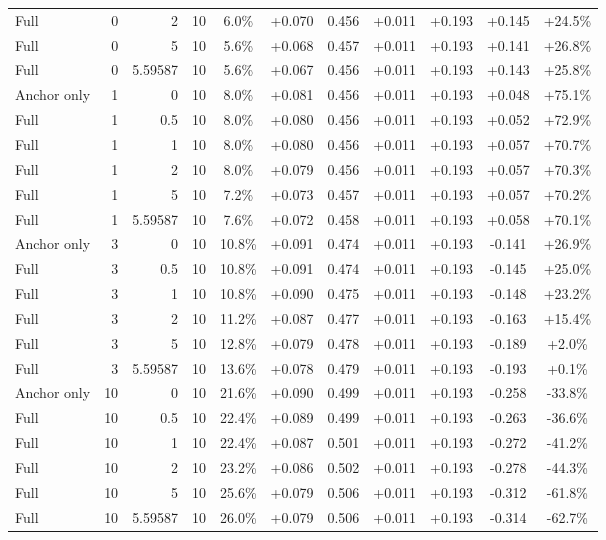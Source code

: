 \begin{table}[htbp]
\begin{tabular}{lrrrccccccc}
Full & 0 & 2 & 10 & 6.0\% & +0.070 & 0.456 & +0.011 & +0.193 & +0.145 & +24.5\% \\
Full & 0 & 5 & 10 & 5.6\% & +0.068 & 0.457 & +0.011 & +0.193 & +0.141 & +26.8\% \\
Full & 0 & 5.59587 & 10 & 5.6\% & +0.067 & 0.456 & +0.011 & +0.193 & +0.143 & +25.8\% \\
Anchor only & 1 & 0 & 10 & 8.0\% & +0.081 & 0.456 & +0.011 & +0.193 & +0.048 & +75.1\% \\
Full & 1 & 0.5 & 10 & 8.0\% & +0.080 & 0.456 & +0.011 & +0.193 & +0.052 & +72.9\% \\
Full & 1 & 1 & 10 & 8.0\% & +0.080 & 0.456 & +0.011 & +0.193 & +0.057 & +70.7\% \\
Full & 1 & 2 & 10 & 8.0\% & +0.079 & 0.456 & +0.011 & +0.193 & +0.057 & +70.3\% \\
Full & 1 & 5 & 10 & 7.2\% & +0.073 & 0.457 & +0.011 & +0.193 & +0.057 & +70.2\% \\
Full & 1 & 5.59587 & 10 & 7.6\% & +0.072 & 0.458 & +0.011 & +0.193 & +0.058 & +70.1\% \\
Anchor only & 3 & 0 & 10 & 10.8\% & +0.091 & 0.474 & +0.011 & +0.193 & -0.141 & +26.9\% \\
Full & 3 & 0.5 & 10 & 10.8\% & +0.091 & 0.474 & +0.011 & +0.193 & -0.145 & +25.0\% \\
Full & 3 & 1 & 10 & 10.8\% & +0.090 & 0.475 & +0.011 & +0.193 & -0.148 & +23.2\% \\
Full & 3 & 2 & 10 & 11.2\% & +0.087 & 0.477 & +0.011 & +0.193 & -0.163 & +15.4\% \\
Full & 3 & 5 & 10 & 12.8\% & +0.079 & 0.478 & +0.011 & +0.193 & -0.189 & +2.0\% \\
Full & 3 & 5.59587 & 10 & 13.6\% & +0.078 & 0.479 & +0.011 & +0.193 & -0.193 & +0.1\% \\
Anchor only & 10 & 0 & 10 & 21.6\% & +0.090 & 0.499 & +0.011 & +0.193 & -0.258 & -33.8\% \\
Full & 10 & 0.5 & 10 & 22.4\% & +0.089 & 0.499 & +0.011 & +0.193 & -0.263 & -36.6\% \\
Full & 10 & 1 & 10 & 22.4\% & +0.087 & 0.501 & +0.011 & +0.193 & -0.272 & -41.2\% \\
Full & 10 & 2 & 10 & 23.2\% & +0.086 & 0.502 & +0.011 & +0.193 & -0.278 & -44.3\% \\
Full & 10 & 5 & 10 & 25.6\% & +0.079 & 0.506 & +0.011 & +0.193 & -0.312 & -61.8\% \\
Full & 10 & 5.59587 & 10 & 26.0\% & +0.079 & 0.506 & +0.011 & +0.193 & -0.314 & -62.7\% \\

\end{tabular}
\end{table}
